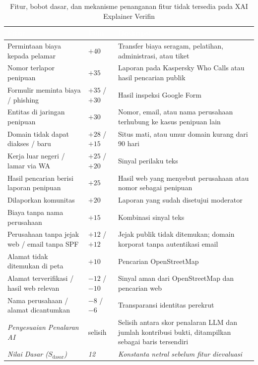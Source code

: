 \documentclass[12pt,a4paper]{article}
\newenvironment{sorotkuning}{%
  \begin{tcolorbox}[
    breakable,
    enhanced,
    frame hidden,
    boxrule=0pt,
    arc=0mm,
    sharp corners,
    colback=yellow!22,
    left=1.5mm, right=1.5mm, top=1.0mm, bottom=1.0mm,
    before skip=1.5pt, after skip=1.5pt
  ]%
}{%
  \end{tcolorbox}%
}
\newcommand{\thead}[1]{\textcolor{white}{\textbf{#1}}}
\begin{document}
\begin{sorotkuning}
\begin{table}[H]
\centering
\caption{Fitur, bobot dasar, dan mekanisme penanganan fitur tidak tersedia pada XAI Explainer Verifin}
\label{tab:xai-weights}
\small
\begin{tabularx}{\linewidth}{|L{3.5cm}|C{2.0cm}|Y|}
\hline
{}\thead{Fitur} & \thead{Poin} & \thead{Deskripsi} \\
\hline
{}Permintaan biaya kepada pelamar & $+40$ & Transfer biaya seragam, pelatihan, administrasi, atau tiket \\ \hline
{}Nomor terlapor penipuan & $+35$ & Laporan pada Kaspersky Who Calls atau hasil pencarian publik \\ \hline
{}Formulir meminta biaya / phishing & $+35$ / $+30$ & Hasil inspeksi Google Form \\ \hline
{}Entitas di jaringan penipuan & $+30$ & Nomor, email, atau nama perusahaan terhubung ke kasus penipuan lain \\ \hline
{}Domain tidak dapat diakses / baru & $+28$ / $+15$ & Situs mati, atau umur domain kurang dari 90 hari \\ \hline
{}Kerja luar negeri / lamar via WA & $+25$ / $+20$ & Sinyal perilaku teks \\ \hline
{}Hasil pencarian berisi laporan penipuan & $+25$ & Hasil web yang menyebut perusahaan atau nomor sebagai penipuan \\ \hline
{}Dilaporkan komunitas & $+20$ & Laporan yang sudah disetujui moderator \\ \hline
{}Biaya tanpa nama perusahaan & $+15$ & Kombinasi sinyal teks \\ \hline
{}Perusahaan tanpa jejak web / email tanpa SPF & $+12$ / $+12$ & Jejak publik tidak ditemukan; domain korporat tanpa autentikasi email \\ \hline
{}Alamat tidak ditemukan di peta & $+10$ & Pencarian OpenStreetMap \\ \hline
{}Alamat terverifikasi / hasil web relevan & $-12$ / $-10$ & Sinyal aman dari OpenStreetMap dan pencarian web \\ \hline
{}Nama perusahaan / alamat dicantumkan & $-8$ / $-6$ & Transparansi identitas perekrut \\ \hline
{}\textit{Penyesuaian Penalaran AI} & selisih & Selisih antara skor penalaran LLM dan jumlah kontribusi bukti, ditampilkan sebagai baris tersendiri \\ \hline
\textit{Nilai Dasar ($S_{\text{dasar}}$)} & \textit{12} & \textit{Konstanta netral sebelum fitur dievaluasi} \\ \hline
\end{tabularx}
\end{table}


\end{sorotkuning}
\end{document}

